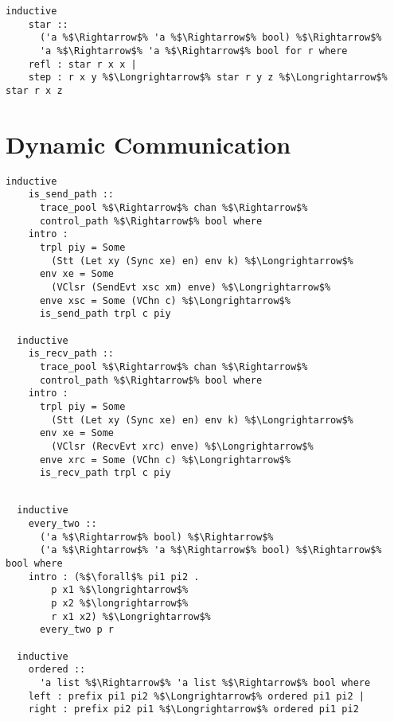 \documentclass{article}
\begin{document}
\begin{lstlisting}[style=codestyle1, escapechar=\%]
  inductive
    star ::
      ('a %$\Rightarrow$% 'a %$\Rightarrow$% bool) %$\Rightarrow$%
      'a %$\Rightarrow$% 'a %$\Rightarrow$% bool for r where
    refl : star r x x |
    step : r x y %$\Longrightarrow$% star r y z %$\Longrightarrow$% star r x z
  \end{lstlisting}



\section{Dynamic Communication}

\begin{lstlisting}[style=codestyle1, escapechar=\%]
  inductive
    is_send_path ::
      trace_pool %$\Rightarrow$% chan %$\Rightarrow$%
      control_path %$\Rightarrow$% bool where
    intro :
      trpl piy = Some
        (Stt (Let xy (Sync xe) en) env k) %$\Longrightarrow$%
      env xe = Some
        (VClsr (SendEvt xsc xm) enve) %$\Longrightarrow$%
      enve xsc = Some (VChn c) %$\Longrightarrow$%
      is_send_path trpl c piy

  inductive
    is_recv_path ::
      trace_pool %$\Rightarrow$% chan %$\Rightarrow$%
      control_path %$\Rightarrow$% bool where
    intro :
      trpl piy = Some
        (Stt (Let xy (Sync xe) en) env k) %$\Longrightarrow$%
      env xe = Some
        (VClsr (RecvEvt xrc) enve) %$\Longrightarrow$%
      enve xrc = Some (VChn c) %$\Longrightarrow$%
      is_recv_path trpl c piy

  \end{lstlisting}
\begin{lstlisting}[style=codestyle1, escapechar=\%]

  inductive
    every_two ::
      ('a %$\Rightarrow$% bool) %$\Rightarrow$%
      ('a %$\Rightarrow$% 'a %$\Rightarrow$% bool) %$\Rightarrow$% bool where
    intro : (%$\forall$% pi1 pi2 .
        p x1 %$\longrightarrow$%
        p x2 %$\longrightarrow$%
        r x1 x2) %$\Longrightarrow$%
      every_two p r

  inductive
    ordered ::
      'a list %$\Rightarrow$% 'a list %$\Rightarrow$% bool where
    left : prefix pi1 pi2 %$\Longrightarrow$% ordered pi1 pi2 |
    right : prefix pi2 pi1 %$\Longrightarrow$% ordered pi1 pi2

  \end{lstlisting}
\end{document}
